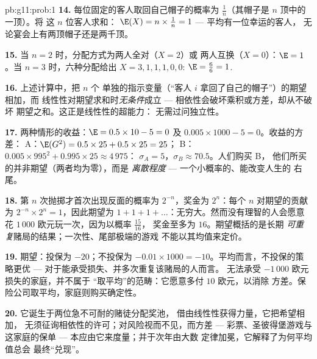 \begin{solution}{pb:g11:prob:1}
\textbf{14.} 每位固定的客人取回自己帽子的概率为
$\frac1n$（其帽子是 $n$ 顶中的一顶）。将
这 $n$ 位客人求和：
$\E(X) = n \times \frac1n = 1$ --- 平均有一位幸运的客人，
无论宴会上有两顶帽子还是两千顶。

\textbf{15.} 当 $n = 2$ 时，分配方式为两人全对（$X = 2$）或
两人互换（$X = 0$）：$\E = 1$。当 $n = 3$ 时，六种分配给出
$X = 3, 1, 1, 1, 0, 0$: $\E = \frac{6}{6} = 1$.

\textbf{16.} 上述计算中，把 $n$ 个
单独的指示变量（“客人 $i$ 拿回了自己的帽子”）的期望相加，而
线性性对期望求和时\emph{无条件}成立 ---
相依性会破坏乘积或方差，却从不破坏
期望之和。这正是线性性的超能力：
无需过问独立性。

\textbf{17.} 两种情形的收益：$\E = 0.5 \times 10 - 5 = 0$ 及
$0.005 \times 1000 - 5 = 0$。收益的方差：
A：$\E(G^2) = 0.5 \times 25 + 0.5 \times 25 = 25$；
B：$0.005 \times 995^2 + 0.995 \times 25 \approx 4\,975$：
$\sigma_A = 5$，$\sigma_B \approx 70.5$。人们购买 B，
他们所买的并非期望（两者均为零），而是
\emph{离散程度} --- 一个小概率的、能改变人生的
右尾。

\textbf{18.} 第 $n$ 次抛掷才首次出现反面的概率为
$2^{-n}$，奖金为 $2^n$：每个 $n$ 对期望的贡献为
$2^{-n} \times 2^n = 1$，因此期望为
$1 + 1 + 1 + \dots$：无穷大。然而没有理智的人会愿意
花 $1\,000$ 欧元玩一次，因为以概率 $\frac{15}{16}$，
奖金至多为 $16$。期望概括的是长期
\emph{可重复}赌局的结果；一次性、尾部极端的游戏
不能以其均值来定价。

\textbf{19.} 期望：投保为 $-20$；不投保为
$-0.01 \times 1000 = -10$。平均而言，不投保的策略更优
--- 对于能承受损失、并多次重复该赌局的人而言。
无法承受 $-1\,000$ 欧元损失的家庭，并不属于
“取平均”的范畴：它愿意多付 $10$ 欧元，以消除
方差。保险公司取平均，家庭则购买确定性。

\textbf{20.} 它诞生于两位急不可耐的赌徒分配奖池，
借由线性性获得力量，它把希望相加，
无须征询相依性的许可；对风险视而不见，而方差
--- 彩票、圣彼得堡游戏与这家庭的保单
--- 本应由它来度量；并于次年由大数
定律加冕，它解释了为何平均值总会
最终“兑现”。
\end{solution}
